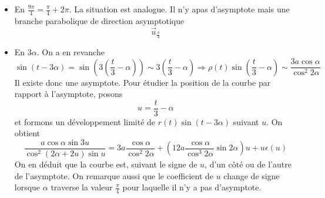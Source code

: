\begin{enumerate}
\begin{itemize}
\item  En $\frac{9\pi }{4}=\frac{\pi }{4}+2\pi $. La situation est analogue.\newline
Il n'y apas d'asymptote mais une branche parabolique de direction asymptotique
\begin{displaymath}
 \overrightarrow{u}_{\frac{\pi }{4}}
\end{displaymath}

\item  En $3\alpha $. On a en revanche 
\begin{displaymath}
 \sin (t-3\alpha )=\sin (3(\frac{t}{3} -\alpha ))\sim 3(\frac{t}{3}-\alpha ) 
\Rightarrow \rho (t)\sin (\frac{t}{3}-\alpha )\sim \frac{3a\cos \alpha }{\cos ^{2}2\alpha }
\end{displaymath}
Il existe donc une asymptote.\newline
Pour étudier la position de la courbe par rapport {\`a} l'asymptote, posons 
\begin{displaymath}
u=\frac{t}{3}-\alpha  
\end{displaymath}
et formons un d{\'e}veloppement limit{\'e} de $r(t)\sin (t-3\alpha )$ suivant $u$. On obtient
\begin{displaymath}
 \frac{a\cos \alpha \sin 3u}{\cos ^{2}(2\alpha +2u)\sin u} 
= 3a\frac{\cos \alpha }{\cos ^{2}2\alpha } + \left( 12a\frac{\cos \alpha }{\cos ^{3}2\alpha }\sin 2\alpha \right) u+u\epsilon (u)
\end{displaymath}
On en d{\'e}duit que la courbe est, suivant le signe de $u$, d'un c{\^o}t{\'e} ou de l'autre de l'asymptote. On remarque aussi que le coefficient de $u$ change de signe lorsque $\alpha $ traverse la valeur $\frac{\pi }{4}$ pour laquelle il n'y a pas d'asymptote.
\end{itemize}


\end{enumerate}
